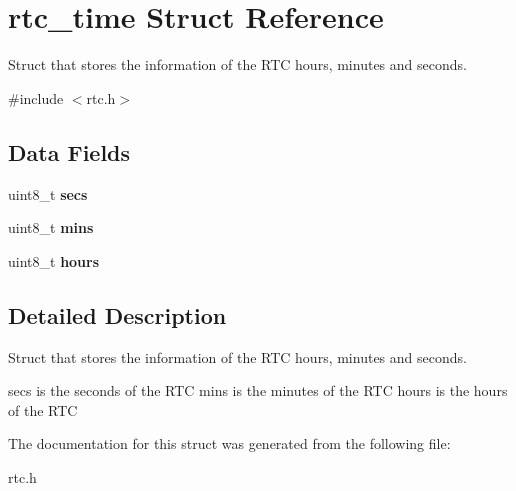 \hypertarget{structrtc__time}{}\section{rtc\+\_\+time Struct Reference}
\label{structrtc__time}


Struct that stores the information of the R\+TC hours, minutes and seconds.  




{\ttfamily \#include $<$rtc.\+h$>$}

\subsection*{Data Fields}
\begin{DoxyCompactItemize}
\item 
uint8\+\_\+t {\bfseries secs}
\item 
uint8\+\_\+t {\bfseries mins}
\item 
uint8\+\_\+t {\bfseries hours}
\end{DoxyCompactItemize}


\subsection{Detailed Description}
Struct that stores the information of the R\+TC hours, minutes and seconds. 

secs is the seconds of the R\+TC mins is the minutes of the R\+TC hours is the hours of the R\+TC 

The documentation for this struct was generated from the following file\+:\begin{DoxyCompactItemize}
\item 
rtc.\+h\end{DoxyCompactItemize}
